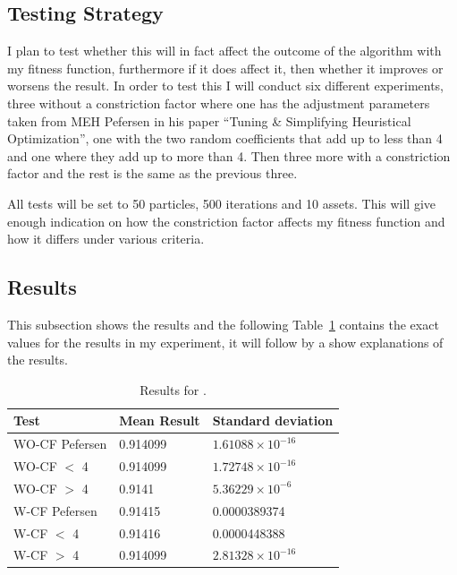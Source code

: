 \documentclass{pdfmx4020}
\begin{document}
    \subsection{Testing Strategy} %
    \label{sub:testing_strategy}
      I plan to test whether this will in fact affect the outcome of the algorithm with my fitness function, furthermore if it does affect it, then whether it improves or worsens the result. In order to test this I will conduct six different experiments, three without a constriction factor where one has the adjustment parameters taken from MEH Pefersen in his paper ``Tuning \& Simplifying Heuristical Optimization''\cite{constriction_factors3}, one with the two random coefficients that add up to less than 4 and one where they add up to more than 4. Then three more with a constriction factor and the rest is the same as the previous three. 

      All tests will be set to 50 particles, 500 iterations and 10 assets. This will give enough indication on how the constriction factor affects my fitness function and how it differs under various criteria.     

    \subsection{Results} %
    \label{sub:results}
      This subsection shows the results and the following Table~\ref{table:constriction_factor_results} contains the exact values for the results in my experiment, it will follow by a show explanations of the results. 

        \begin{table}[ht]
          \setlength{\extrarowheight}{2.0pt}
          \begin{tabular}{|l|l|l|}
            \hline
            Test & Mean Result & Standard deviation \\
            \hline
            WO-CF Pefersen & 0.914099 & $1.61088\times10^{-16}$ \\
            \hline
            WO-CF $<$ 4 & 0.914099 & $1.72748\times10^{-16}$ \\
            \hline
            WO-CF $>$ 4 & 0.9141 & $5.36229\times10^{-6}$ \\
            \hline
            W-CF Pefersen & 0.91415 & 0.0000389374 \\
            \hline
            W-CF $<$ 4 & 0.91416 & 0.0000448388 \\
            \hline
            W-CF $>$ 4 & 0.914099 & $2.81328\times10^{-16}$ \\
            \hline
          \end{tabular}
          \caption{Results for .}
          \label{table:constriction_factor_results}
        \end{table}
\end{document}
